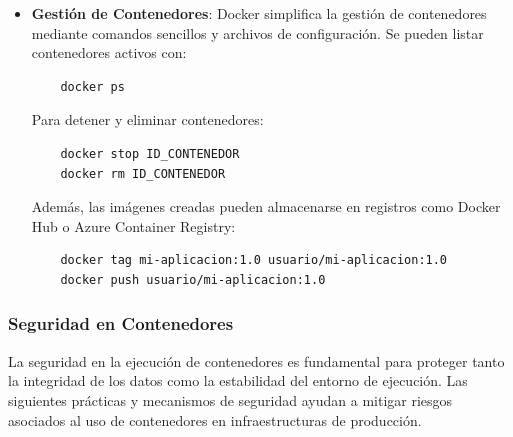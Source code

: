 {\begin{itemize}
                    \begin{verbatim}
    # Ejemplo básico de Dockerfile
    FROM python:3.9-slim
    WORKDIR /app
    COPY requirements.txt .
    RUN pip install -r requirements.txt
    COPY . .
    CMD ["python", "app.py"]
                    \end{verbatim}
                    
                    Luego, la imagen se construye y se ejecuta con los siguientes comandos:
                    
                    \begin{verbatim}
    docker build -t mi-aplicacion:1.0 .
    docker run -d -p 5000:5000 mi-aplicacion:1.0
                    \end{verbatim}
                
                    \item \textbf{Gestión de Contenedores}: Docker simplifica la gestión de contenedores mediante comandos sencillos y archivos de configuración. Se pueden listar contenedores activos con:
                
                    \begin{verbatim}
    docker ps
                    \end{verbatim}
                
                    Para detener y eliminar contenedores:
                
                    \begin{verbatim}
    docker stop ID_CONTENEDOR
    docker rm ID_CONTENEDOR
                    \end{verbatim}
                
                    Además, las imágenes creadas pueden almacenarse en registros como Docker Hub o Azure Container Registry:
                
                    \begin{verbatim}
    docker tag mi-aplicacion:1.0 usuario/mi-aplicacion:1.0
    docker push usuario/mi-aplicacion:1.0
                    \end{verbatim}
                \end{itemize}
            
            \subsubsection{Seguridad en Contenedores}
                La seguridad en la ejecución de contenedores es fundamental para proteger tanto la integridad de los datos como la estabilidad del entorno de ejecución. Las siguientes prácticas y mecanismos de seguridad ayudan a mitigar riesgos asociados al uso de contenedores en infraestructuras de producción.

}
